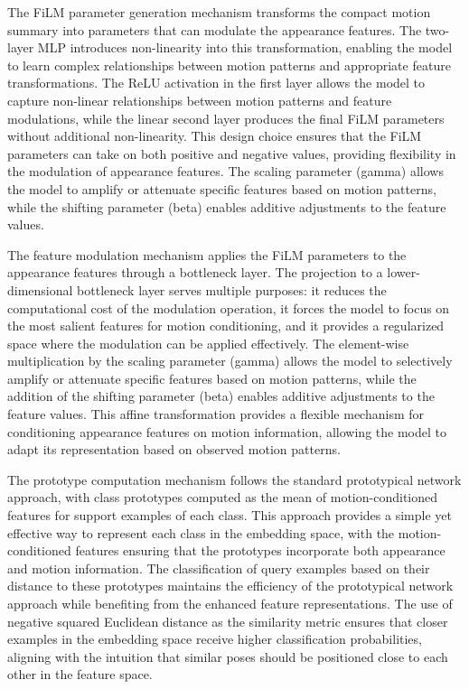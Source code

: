 \documentclass[11pt]{article}
\begin{document}
The FiLM parameter generation mechanism transforms the compact motion summary into parameters that can modulate the appearance features. The two-layer MLP introduces non-linearity into this transformation, enabling the model to learn complex relationships between motion patterns and appropriate feature transformations. The ReLU activation in the first layer allows the model to capture non-linear relationships between motion patterns and feature modulations, while the linear second layer produces the final FiLM parameters without additional non-linearity. This design choice ensures that the FiLM parameters can take on both positive and negative values, providing flexibility in the modulation of appearance features. The scaling parameter (gamma) allows the model to amplify or attenuate specific features based on motion patterns, while the shifting parameter (beta) enables additive adjustments to the feature values.

The feature modulation mechanism applies the FiLM parameters to the appearance features through a bottleneck layer. The projection to a lower-dimensional bottleneck layer serves multiple purposes: it reduces the computational cost of the modulation operation, it forces the model to focus on the most salient features for motion conditioning, and it provides a regularized space where the modulation can be applied effectively. The element-wise multiplication by the scaling parameter (gamma) allows the model to selectively amplify or attenuate specific features based on motion patterns, while the addition of the shifting parameter (beta) enables additive adjustments to the feature values. This affine transformation provides a flexible mechanism for conditioning appearance features on motion information, allowing the model to adapt its representation based on observed motion patterns.

The prototype computation mechanism follows the standard prototypical network approach, with class prototypes computed as the mean of motion-conditioned features for support examples of each class. This approach provides a simple yet effective way to represent each class in the embedding space, with the motion-conditioned features ensuring that the prototypes incorporate both appearance and motion information. The classification of query examples based on their distance to these prototypes maintains the efficiency of the prototypical network approach while benefiting from the enhanced feature representations. The use of negative squared Euclidean distance as the similarity metric ensures that closer examples in the embedding space receive higher classification probabilities, aligning with the intuition that similar poses should be positioned close to each other in the feature space.
\end{document}
